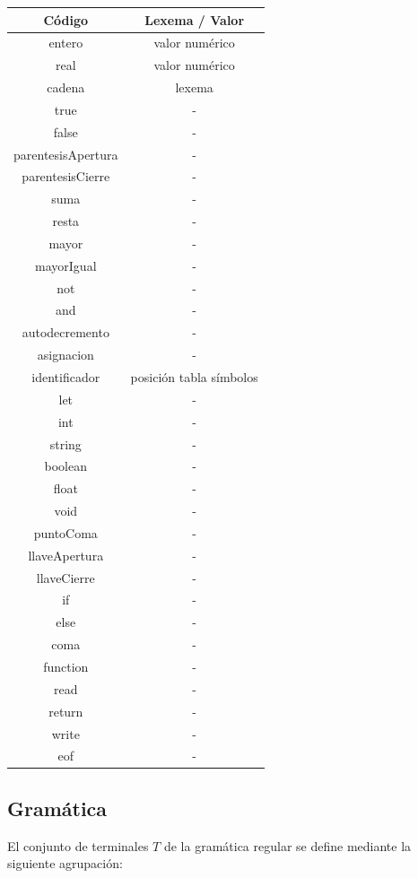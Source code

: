 \documentclass{article}
\begin{document}
\begin{center}
\begin{tabular}{c | c}
    \textbf{Código} & \textbf{Lexema / Valor} \\ \hline
    entero & valor numérico \\
    real & valor numérico \\
    cadena & lexema \\
    true & - \\
    false & - \\
    parentesisApertura & - \\
    parentesisCierre & - \\
    suma & - \\
    resta & - \\
    mayor & - \\
    mayorIgual & - \\
    not & - \\
    and & - \\
    autodecremento & - \\
    asignacion & - \\
    identificador & posición tabla símbolos \\
    let & - \\
    int & - \\
    string & - \\
    boolean & - \\
    float & - \\
    void & - \\
    puntoComa & - \\
    llaveApertura & - \\
    llaveCierre & - \\
    if & - \\
    else & - \\
    coma & - \\
    function & - \\
    read & - \\
    return & - \\
    write & - \\
    eof & - \\
\end{tabular}
\end{center}

\subsection{Gramática}
El conjunto de terminales $T$ de la gramática regular se define mediante la siguiente agrupación:
\end{document}
